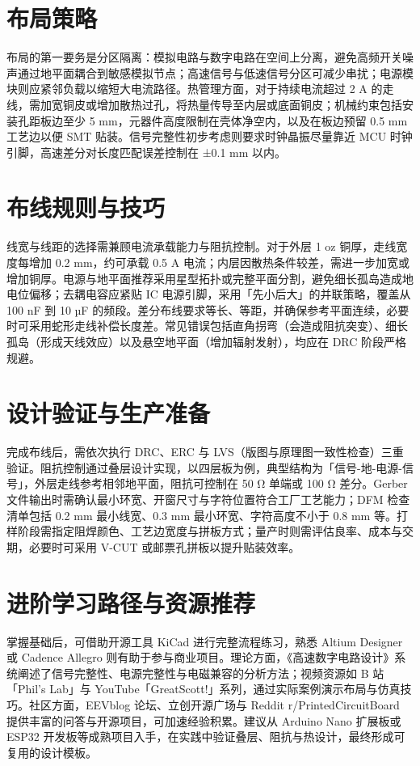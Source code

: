 \chapter{布局策略}
布局的第一要务是分区隔离：模拟电路与数字电路在空间上分离，避免高频开关噪声通过地平面耦合到敏感模拟节点；高速信号与低速信号分区可减少串扰；电源模块则应紧邻负载以缩短大电流路径。热管理方面，对于持续电流超过 2 A 的走线，需加宽铜皮或增加散热过孔，将热量传导至内层或底面铜皮；机械约束包括安装孔距板边至少 5 mm，元器件高度限制在壳体净空内，以及在板边预留 0.5 mm 工艺边以便 SMT 贴装。信号完整性初步考虑则要求时钟晶振尽量靠近 MCU 时钟引脚，高速差分对长度匹配误差控制在 ±0.1 mm 以内。\par
\chapter{布线规则与技巧}
线宽与线距的选择需兼顾电流承载能力与阻抗控制。对于外层 1 oz 铜厚，走线宽度每增加 0.2 mm，约可承载 0.5 A 电流；内层因散热条件较差，需进一步加宽或增加铜厚。电源与地平面推荐采用星型拓扑或完整平面分割，避免细长孤岛造成地电位偏移；去耦电容应紧贴 IC 电源引脚，采用「先小后大」的并联策略，覆盖从 100 nF 到 10 µF 的频段。差分布线要求等长、等距，并确保参考平面连续，必要时可采用蛇形走线补偿长度差。常见错误包括直角拐弯（会造成阻抗突变）、细长孤岛（形成天线效应）以及悬空地平面（增加辐射发射），均应在 DRC 阶段严格规避。\par
\chapter{设计验证与生产准备}
完成布线后，需依次执行 DRC、ERC 与 LVS（版图与原理图一致性检查）三重验证。阻抗控制通过叠层设计实现，以四层板为例，典型结构为「信号-地-电源-信号」，外层走线参考相邻地平面，阻抗可控制在 50 Ω 单端或 100 Ω 差分。Gerber 文件输出时需确认最小环宽、开窗尺寸与字符位置符合工厂工艺能力；DFM 检查清单包括 0.2 mm 最小线宽、0.3 mm 最小环宽、字符高度不小于 0.8 mm 等。打样阶段需指定阻焊颜色、工艺边宽度与拼板方式；量产时则需评估良率、成本与交期，必要时可采用 V-CUT 或邮票孔拼板以提升贴装效率。\par
\chapter{进阶学习路径与资源推荐}
掌握基础后，可借助开源工具 KiCad 进行完整流程练习，熟悉 Altium Designer 或 Cadence Allegro 则有助于参与商业项目。理论方面，《高速数字电路设计》系统阐述了信号完整性、电源完整性与电磁兼容的分析方法；视频资源如 B 站「Phil’s Lab」与 YouTube「GreatScott!」系列，通过实际案例演示布局与仿真技巧。社区方面，EEVblog 论坛、立创开源广场与 Reddit r/PrintedCircuitBoard 提供丰富的问答与开源项目，可加速经验积累。建议从 Arduino Nano 扩展板或 ESP32 开发板等成熟项目入手，在实践中验证叠层、阻抗与热设计，最终形成可复用的设计模板。\par
